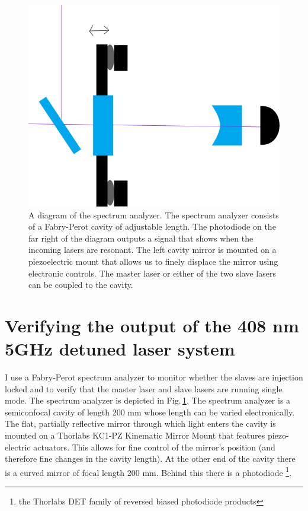 \begin{figure}
    \centerline{\includegraphics[totalheight=0.3\textheight ]{spectrumAnalyzer}}
    \caption[Spectrum analyzer diagram]{\label{fig:spectrumAnalyzer}
    A diagram of the spectrum analyzer. The spectrum analyzer consists of a Fabry-Perot cavity of adjustable length. The photodiode on the far right of the diagram outputs a signal that shows when the incoming lasers are resonant. The left cavity mirror is mounted on a piezoelectric mount that allows us to finely displace the mirror using electronic controls. The master laser or either of the two slave lasers can be coupled to the cavity.
}
\end{figure} 

\section{Verifying the output of the 408 nm 5GHz detuned laser system}
\label{spectAnalayzer}
I use a Fabry-Perot spectrum analyzer to monitor whether the slaves are injection locked and to verify that the master laser and slave lasers are running single mode. The spectrum analyzer is depicted in Fig.\,\ref{fig:spectrumAnalyzer}. 
The spectrum analyzer is a semiconfocal cavity of length 200 mm whose length can be varied electronically. The flat, partially reflective mirror through which light enters the cavity is mounted on a Thorlabs KC1-PZ Kinematic Mirror Mount that features piezo-electric actuators. This allows for fine control of the mirror's position (and therefore fine changes in the cavity length). At the other end of the cavity there is a curved mirror of focal length 200 mm. Behind this there is a photodiode \footnote{the Thorlabs DET family of reversed biased photodiode products}.

